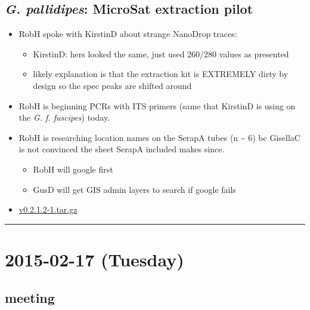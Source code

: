 \documentclass[letterpaper]{scrartcl}
\begin{document}
\subsection{\emph{G. pallidipes}: MicroSat extraction
pilot}\label{g.-pallidipes-microsat-extraction-pilot}

\begin{itemize}
\itemsep1pt\parskip0pt
\item
  RobH spoke with KirstinD about strange NanoDrop traces:

  \begin{itemize}
  \itemsep1pt\parskip0pt
  \item
    KirstinD: hers looked the same, just used 260/280 values as
    presented
  \item
    likely explanation is that the extraction kit is EXTREMELY dirty by
    design so the spec peaks are shifted around
  \end{itemize}
\item
  RobH is beginning PCRs with ITS primers (same that KirstinD is using
  on the \emph{G. f. fuscipes}) today.
\item
  RobH is researching location names on the SerapA tubes (n
  \textasciitilde{} 6) bc GisellaC is not convinced the sheet SerapA
  included makes since.

  \begin{itemize}
  \itemsep1pt\parskip0pt
  \item
    RobH will google first
  \item
    GusD will get GIS admin layers to search if google fails
  \end{itemize}
\item
  \href{https://github.com/xguse/blacktie/archive/v0.2.1.2-1.tar.gz}{v0.2.1.2-1.tar.gz}
\end{itemize}

\begin{center}\rule{0.5\linewidth}{\linethickness}\end{center}

\section{2015-02-17 (Tuesday)}\label{tuesday-2}

\subsection{meeting}\label{meeting}
\end{document}
